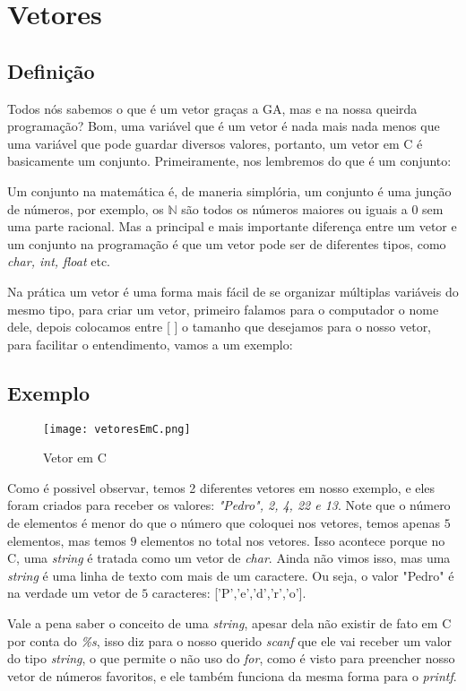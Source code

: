 \documentclass{article}
\begin{document}
    \section{Vetores}
    \subsection{Definição}
    Todos nós sabemos o que é um vetor graças a GA, mas e na
    nossa queirda programação? Bom, uma variável que é um vetor
    é nada mais nada menos que uma variável que pode guardar
    diversos valores, portanto, um vetor em C é basicamente um
    conjunto. Primeiramente, nos lembremos do que é um conjunto:
    
    Um conjunto na matemática é, de maneria simplória, um 
    conjunto é uma junção de números, por exemplo, os 
    $\mathbb{N}$ são todos os números maiores ou iguais a $0$
    sem uma parte racional. Mas a principal e mais importante
    diferença entre um vetor e um conjunto na programação é que
    um vetor pode ser de diferentes tipos, como \emph{char, int,
    float} etc.
    
    Na prática um vetor é uma forma mais fácil de se organizar
    múltiplas variáveis do mesmo tipo, para criar um vetor, 
    primeiro falamos para o computador o nome dele, depois 
    colocamos entre [  ] o tamanho que desejamos para o nosso
    vetor, para facilitar o entendimento, vamos a um exemplo:
    \subsection*{Exemplo}
    \begin{figure}[h]
        \centering
        \texttt{[image: vetoresEmC.png]}
        \caption{Vetor em C}
        \label{fig:vetoresEmC}
    \end{figure}

    Como é possivel observar, temos 2 diferentes vetores em
    nosso exemplo, e eles foram criados para receber os valores:
    \emph{"Pedro", 2, 4, 22 e 13}. Note que o número de elementos
    é menor do que o número que coloquei nos vetores, temos
    apenas $5$ elementos, mas temos $9$ elementos no total nos
    vetores. Isso acontece porque no C, uma \emph{string} é
    tratada como um vetor de \emph{char}. Ainda não vimos isso,
    mas uma \emph{string} é uma linha de texto com mais de um
    caractere. Ou seja, o valor "Pedro" é na verdade um vetor de
    $5$ caracteres: ['P','e','d','r','o'].

    Vale a pena saber o conceito de uma \emph{string}, apesar
    dela não existir de fato em C por conta do \emph{\%s}, isso
    diz para o nosso querido \emph{scanf} que ele vai receber um
    valor do tipo \emph{string}, o que permite o não uso do 
    \emph{for}, como é visto para preencher nosso vetor de
    números favoritos, e ele também funciona da mesma forma para
    o \emph{printf}.
\end{document}
